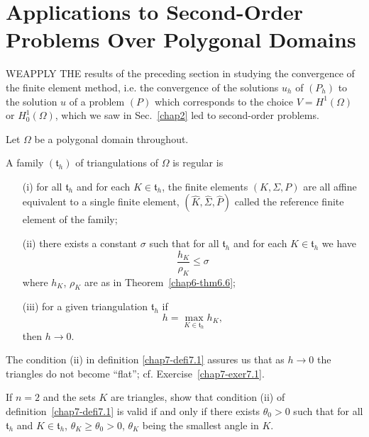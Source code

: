 
\chapter[Applications to Second-Order Problems...]{Applications to
  Second-Order Problems Over Polygonal Domains}\label{chap7}

WE\pageoriginale APPLY THE results of the preceding section in
studying the convergence of the finite element method, i.e. the
convergence of the solutions $u_{h}$ of $(P_{h})$ to the solution $u$
of a problem $(P)$ which corresponds to the choice $V=H^{1}(\Omega)$
or $H^{1}_{0}(\Omega)$, which we saw in Sec.~\ref{chap2} led to
second-order problems.


Let $\Omega$ be a polygonal domain throughout.

\begin{definition}\label{chap7-defi7.1}
A family $(\mathfrak{t}_{h})$ of triangulations of $\Omega$ is regular
is
\begin{itemize}
\item[(i)] for all $\mathfrak{t}_{h}$ and for each
  $K\in\mathfrak{t}_{h}$, the finite elements $(K,\Sigma,P)$ are all
  affine equivalent to a single finite element,
  $(\hat{K},\hat{\Sigma},\hat{P})$ called the reference finite element
  of the family;

\item[(ii)] there exists a constant $\sigma$ such that for all
  $\mathfrak{t}_{h}$ and for each $K\in\mathfrak{t}_{h}$ we have
\begin{equation*}
\frac{h_{K}}{\rho_{K}}\leq \sigma\tag{7.1}\label{chap7-eq7.1}
\end{equation*}
where $h_{K}$, $\rho_{K}$ are as in Theorem~\ref{chap6-thm6.6};

\item[(iii)] for a given triangulation $\mathfrak{t}_{h}$ if
\begin{equation*}
h=\max\limits_{K\in\mathfrak{t}_{h}}h_{K},\tag{7.2}\label{chap7-eq7.2}
\end{equation*}
then $h\to 0$.
\end{itemize}
\end{definition}

\begin{remark}\label{chap7-rem7.1}
The condition (ii) in definition \ref{chap7-defi7.1} assures us that
as $h\to 0$ the triangles do not become ``flat''; cf.\@
Exercise~\ref{chap7-exer7.1}. 
\end{remark}

\begin{exercise}\label{chap7-exer7.1}
If $n=2$ and the sets $K$ are triangles, show that condition (ii) of
definition~\ref{chap7-defi7.1} is valid if and only if there exists
$\theta_{0}>0$ such that for all\pageoriginale $\mathfrak{t}_{h}$ and
$K\in\mathfrak{t}_{h}$, $\theta_{K}\geq \theta_{0}>0$, $\theta_{K}$
being the smallest angle in $K$.
\end{exercise}

